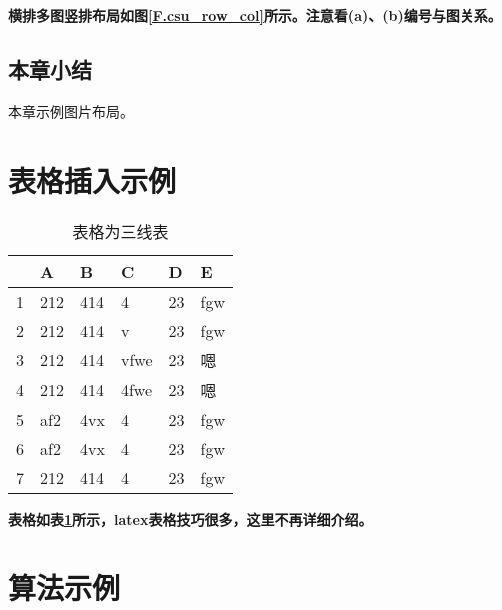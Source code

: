 \textbf{横排多图竖排布局如图\ref{F.csu_row_col}所示。注意看(a)、(b)编号与图关系。}

\subsection{本章小结}
本章示例图片布局。

\newpage


\section{表格插入示例}

\begin{table}[htb]
  \centering
  \caption{表格为三线表}
  \label{T.example}
  \begin{tabular}{llllll}
  	\toprule
   & A  & B  & C  & D  & E \\
  \toprule
1 	& 212 & 414 & 4 		& 23 & fgw	\\
2 	& 212 & 414 & v 		& 23 & fgw	\\
3 	& 212 & 414 & vfwe		& 23 & 嗯	\\
4 	& 212 & 414 & 4fwe		& 23 & 嗯	\\
5 	& af2 & 4vx & 4 		& 23 & fgw	\\
6 	& af2 & 4vx & 4 		& 23 & fgw	\\
7 	& 212 & 414 & 4 		& 23 & fgw	\\
\bottomrule

\end{tabular}
\end{table}




\textbf{表格如表\ref{T.example}所示，latex表格技巧很多，这里不再详细介绍。}


\newpage

\section{算法示例}


